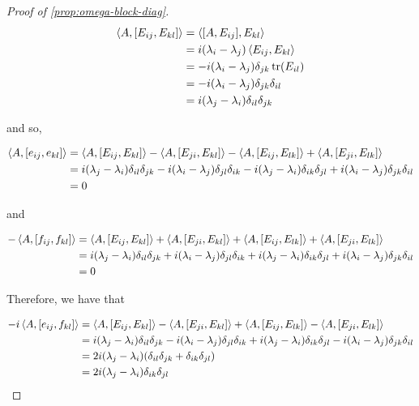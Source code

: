 \documentclass{article}
\begin{document}
\begin{proof}
    [Proof of \cref{prop:omega-block-diag}]
    \begin{align*}
\left\langle A, [E_{ij}, E_{kl}] \right\rangle &= \left\langle [A, E_{ij}], E_{kl} \right\rangle \\
&= i(\lambda_i - \lambda_j)\left\langle E_{ij}, E_{kl} \right\rangle \\
    &= -i(\lambda_i - \lambda_j)\delta_{jk}\tr(E_{il}) \\
    &= -i(\lambda_i - \lambda_j)\delta_{jk}\delta_{il} \\
    &= i(\lambda_j - \lambda_i)\delta_{il}\delta_{jk}
\end{align*}

and so,

\begin{align*}
    \left\langle A, [e_{ij}, e_{kl}] \right\rangle &= \left\langle A, [E_{ij}, E_{kl}] \right\rangle - \left\langle A, [E_{ji}, E_{kl}] \right\rangle - \left\langle A, [E_{ij}, E_{lk}] \right\rangle + \left\langle A, [E_{ji}, E_{lk}] \right\rangle \\
    &= i(\lambda_j - \lambda_i)\delta_{il}\delta_{jk} - i(\lambda_i - \lambda_j)\delta_{jl}\delta_{ik} - i(\lambda_j - \lambda_i)\delta_{ik}\delta_{jl} + i(\lambda_i - \lambda_j)\delta_{jk}\delta_{il} \\
    &= 0
\end{align*}

and

\begin{align*}
    -\left\langle A, [f_{ij}, f_{kl}] \right\rangle &= \left\langle A, [E_{ij}, E_{kl}] \right\rangle + \left\langle A, [E_{ji}, E_{kl}] \right\rangle + \left\langle A, [E_{ij}, E_{lk}] \right\rangle + \left\langle A, [E_{ji}, E_{lk}] \right\rangle \\
    &= i(\lambda_j - \lambda_i)\delta_{il}\delta_{jk} + i(\lambda_i - \lambda_j)\delta_{jl}\delta_{ik} + i(\lambda_j - \lambda_i)\delta_{ik}\delta_{jl} + i(\lambda_i - \lambda_j)\delta_{jk}\delta_{il} \\
    &= 0
\end{align*}

Therefore, we have that

\begin{align*}
    -i\left\langle A, [e_{ij}, f_{kl}] \right\rangle &= \left\langle A, [E_{ij}, E_{kl}] \right\rangle - \left\langle A, [E_{ji}, E_{kl}] \right\rangle + \left\langle A, [E_{ij}, E_{lk}] \right\rangle - \left\langle A, [E_{ji}, E_{lk}] \right\rangle \\
    &= i(\lambda_j - \lambda_i)\delta_{il}\delta_{jk} - i(\lambda_i - \lambda_j)\delta_{jl}\delta_{ik} + i(\lambda_j - \lambda_i)\delta_{ik}\delta_{jl} - i(\lambda_i - \lambda_j)\delta_{jk}\delta_{il} \\
    &= 2i(\lambda_j - \lambda_i)(\delta_{il}\delta_{jk} + \delta_{ik}\delta_{jl}) \\
    &= 2i(\lambda_j - \lambda_i)\delta_{ik}\delta_{jl}
\end{align*}


\end{proof}
\end{document}
